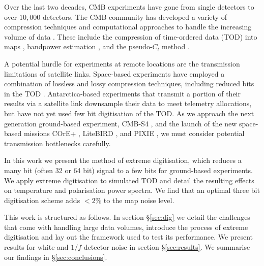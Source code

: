 \documentclass[apj]{emulateapj}
\begin{document}

Over the last two decades, CMB experiments have gone from single detectors to over $10,000$ detectors. The CMB community has developed a variety of compression techniques and computational approaches to handle the increasing volume of data \citep{tristam2007}. These include the compression of time-ordered data (TOD) into maps \citep{tegmark1997}, bandpower estimation \citep{tegmark1998}, and the pseudo-$C_l$ method \citep{brown2005}.

A potential hurdle for experiments at remote locations are the transmission limitations of satellite links. Space-based experiments have employed a combination of lossless and lossy compression techniques, including reduced bits in the TOD \citep{gaztanaga1998, maris2003}. Antarctica-based experiments that transmit a portion of their results via a satellite link downsample their data to meet telemetry allocations, but have not yet used few bit digitisation of the TOD. As we approach the next generation ground-based experiment, CMB-S4 \citep{s4sciencebook}, and the launch of the new space-based missions COrE+ \citep{core2018}, LiteBIRD \citep{litebird2016}, and PIXIE \citep{pixie2011}, we must consider potential transmission bottlenecks carefully. %

In this work we present the method of extreme digitisation, which reduces a many bit (often 32 or 64 bit) signal to a few bits for ground-based experiments. We apply extreme digitisation to simulated TOD and detail the resulting effects on temperature and polarisation power spectra. We find that an optimal three bit digitisation scheme adds $<2\%$ to the map noise level.

This work is structured as follows. In section \S\ref{sec:dig} we detail the challenges that come with handling large data volumes, introduce the process of extreme digitisation and lay out the framework used to test its performance. We present results for white and $1/f$ detector noise in section \S\ref{sec:results}. We summarise our findings in \S\ref{sec:conclusions}.

\end{document}
